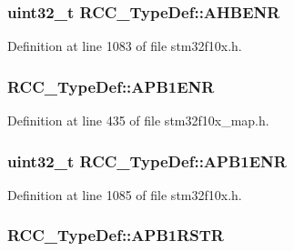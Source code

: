 \subsubsection[{\texorpdfstring{A\+H\+B\+E\+NR}{AHBENR}}]{ {\bf uint32\+\_\+t} R\+C\+C\+\_\+\+Type\+Def\+::\+A\+H\+B\+E\+NR}\hypertarget{struct_r_c_c___type_def_abaebc9204bbc1708356435a5a01e70eb}{}\label{struct_r_c_c___type_def_abaebc9204bbc1708356435a5a01e70eb}


Definition at line 1083 of file stm32f10x.\+h.

\subsubsection[{\texorpdfstring{A\+P\+B1\+E\+NR}{APB1ENR}}]{ R\+C\+C\+\_\+\+Type\+Def\+::\+A\+P\+B1\+E\+NR}\hypertarget{struct_r_c_c___type_def_aac119612ff0201cea60c03180be197d7}{}\label{struct_r_c_c___type_def_aac119612ff0201cea60c03180be197d7}


Definition at line 435 of file stm32f10x\+\_\+map.\+h.

\subsubsection[{\texorpdfstring{A\+P\+B1\+E\+NR}{APB1ENR}}]{ {\bf uint32\+\_\+t} R\+C\+C\+\_\+\+Type\+Def\+::\+A\+P\+B1\+E\+NR}\hypertarget{struct_r_c_c___type_def_aec7622ba90341c9faf843d9ee54a759f}{}\label{struct_r_c_c___type_def_aec7622ba90341c9faf843d9ee54a759f}


Definition at line 1085 of file stm32f10x.\+h.

\subsubsection[{\texorpdfstring{A\+P\+B1\+R\+S\+TR}{APB1RSTR}}]{ R\+C\+C\+\_\+\+Type\+Def\+::\+A\+P\+B1\+R\+S\+TR}\hypertarget{struct_r_c_c___type_def_afc9fdc77b261acf0bd8087f35dbb9c60}{}\label{struct_r_c_c___type_def_afc9fdc77b261acf0bd8087f35dbb9c60}


